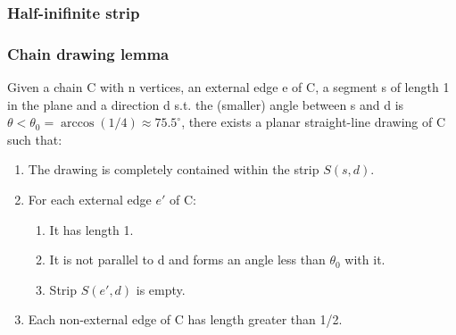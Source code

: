 \documentclass[xetex,mathserif,serif]{beamer}
\begin{document}
\begin{frame}
  \frametitle{Half-inifinite strip}

  \begin{figure}
  \end{figure}
\end{frame}

\begin{frame}
  \frametitle{Chain drawing lemma}
  \begin{lemma}
    Given a chain C with n vertices, an external edge e of C, a segment s of length 1 in the plane and a direction d s.t. the (smaller) angle between s and d is \(\theta < \theta_0 = \arccos(1/4)\approx 75.5^{\circ}\), there exists a planar straight-line drawing of C such that:
    \begin{enumerate}
    \item The drawing is completely contained within the strip \(S(s, d)\).
    \item For each external edge \(e'\) of C:
      \begin{enumerate}
      \item It has length 1.
      \item It is not parallel to d and forms an angle less than \(\theta_0\) with it.
      \item Strip \(S(e', d)\) is empty.
      \end{enumerate}
    \item Each non-external edge of C has length greater than 1/2.
    \end{enumerate}
  \end{lemma}
\end{frame}
\end{document}
